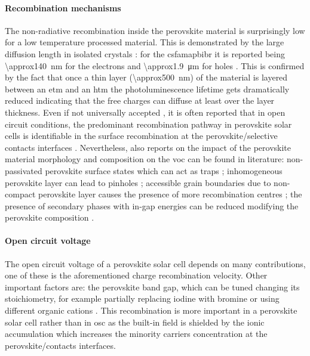 	\paragraph{Recombination mechanisms}
The non-radiative recombination inside the perovskite material is surprisingly low for a low temperature processed material. This is demonstrated by the large diffusion length in isolated crystals \cite{Wehrenfennig2014,Wehrenfennig2014a,Stranks2013,Xing2013,Shi2015a,Eperon2014}: for the \gls{csfamapbibr} it is reported being \SI{\approx140}{\nm} for the electrons and \SI{\approx1.9}{\um} for holes \cite{Liu2017}.
This is confirmed by the fact that once a thin layer (\SI{\approx500}{\nm}) of the material is layered between an \gls{etm} and an \gls{htm} the photoluminescence lifetime gets dramatically reduced \cite{Jimenez-Lopez2017,Eperon2014} indicating that the free charges can diffuse at least over the layer thickness.
Even if not universally accepted \cite{Valadez-Villalobos2019}, it is often reported that in open circuit conditions, the predominant recombination pathway in perovskite solar cells is identifiable in the surface recombination at the perovskite/selective contacts interfaces \cite{Calado2018b,Stolterfoht2018a,Stolterfoht2018,Gelmetti2019,Shao2016}.
Nevertheless, also reports on the impact of the perovskite material morphology and composition on the \gls{voc} can be found in literature: non-passivated perovskite surface states which can act as traps \cite{Zheng2017}; inhomogeneous perovskite layer can lead to pinholes \cite{Lee2015,Montcada2017,Qiu2016}; accessible grain boundaries due to non-compact perovskite layer causes the presence of more recombination centres \cite{Shao2016a}; the presence of secondary phases with in-gap energies can be reduced modifying the perovskite composition \cite{Bi2016}.

	\paragraph{Open circuit voltage}
The open circuit voltage of a perovskite solar cell depends on many contributions, one of these is the aforementioned charge recombination velocity. Other important factors are: the perovskite band gap, which can be tuned changing its stoichiometry, for example partially replacing iodine with bromine \cite{McMeekin2016,Noh2013a,Wheeler2017} or using different organic cations \cite{Eperon2014}.
This recombination is more important in a perovskite solar cell rather than in \gls{osc} as the built-in field is shielded by the ionic accumulation which increases the minority carriers concentration at the perovskite/contacts interfaces.

